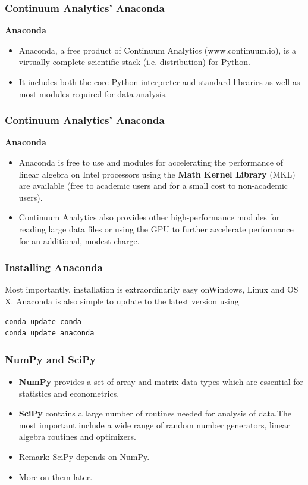 \documentclass[MASTER.tex]{subfiles}
\begin{document}
\begin{frame}
\frametitle{Continuum Analytics’ Anaconda}
\large
\textbf{Anaconda}
\begin{itemize}
\item Anaconda, a free product of Continuum Analytics (www.continuum.io), is a virtually complete scientific
stack (i.e. distribution) for Python. 
\item It includes both the core Python interpreter and standard libraries as well as most
modules required for data analysis. 

\end{itemize}
\end{frame}
\begin{frame}
\frametitle{Continuum Analytics’ Anaconda}
\large
\textbf{Anaconda}
	\begin{itemize}
\item Anaconda is free to use and modules for accelerating the performance
of linear algebra on Intel processors using the \textbf{Math Kernel Library} (MKL) are available (free to
academic users and for a small cost to non-academic users). 
\item Continuum Analytics also provides other
high-performance modules for reading large data files or using the GPU to further accelerate performance
for an additional, modest charge. 
	\end{itemize}

\end{frame}
\begin{frame}[fragile]
\frametitle{Installing Anaconda}
Most importantly, installation is extraordinarily easy onWindows, Linux
and OS X. Anaconda is also simple to update to the latest version using
\begin{framed}
\begin{verbatim}
conda update conda
conda update anaconda
\end{verbatim}
\end{framed}
\end{frame}
\begin{frame}
\frametitle{NumPy and SciPy}

\begin{itemize}
\item \textbf{NumPy} provides a set of array and matrix data types which are essential for statistics and econometrics.

\item \textbf{SciPy} contains a large number of routines needed for analysis of data.The most important include a wide
range of random number generators, linear algebra routines and optimizers. 

\item Remark: SciPy depends on NumPy.

\item More on them later.
\end{itemize}
\end{frame}
\end{document}
